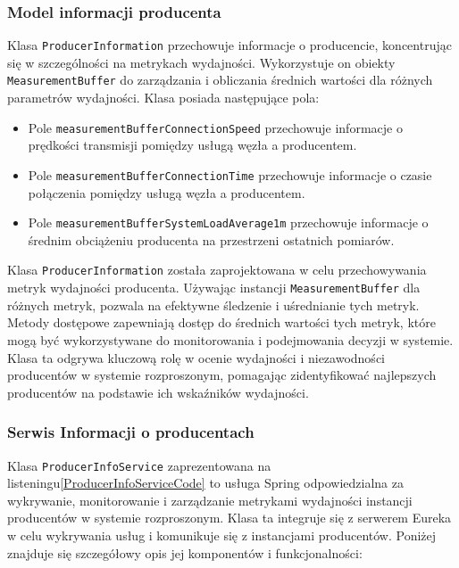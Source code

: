 \subsubsection{Model informacji producenta}

Klasa \verb|ProducerInformation| przechowuje informacje o producencie, koncentrując się w szczególności na metrykach wydajności. Wykorzystuje on obiekty \verb|MeasurementBuffer| do zarządzania i obliczania średnich wartości dla różnych parametrów wydajności. Klasa posiada następujące pola:

\begin{itemize}
    \item Pole \verb|measurementBufferConnectionSpeed| przechowuje informacje o prędkości transmisji pomiędzy usługą węzła a producentem.
    \item Pole \verb|measurementBufferConnectionTime| przechowuje informacje o czasie połączenia pomiędzy usługą węzła a producentem.
    \item Pole \verb|measurementBufferSystemLoadAverage1m| przechowuje informacje o średnim obciążeniu producenta na przestrzeni ostatnich pomiarów.
\end{itemize}

Klasa \verb|ProducerInformation| została zaprojektowana w celu przechowywania metryk wydajności producenta. Używając instancji \verb|MeasurementBuffer| dla różnych metryk, pozwala na efektywne śledzenie i uśrednianie tych metryk. Metody dostępowe zapewniają dostęp do średnich wartości tych metryk, które mogą być wykorzystywane do monitorowania i podejmowania decyzji w systemie. Klasa ta odgrywa kluczową rolę w ocenie wydajności i niezawodności producentów w systemie rozproszonym, pomagając zidentyfikować najlepszych producentów na podstawie ich wskaźników wydajności.

\subsubsection{Serwis Informacji o producentach}

Klasa \verb|ProducerInfoService| zaprezentowana na listeningu\ref{ProducerInfoServiceCode} to usługa Spring odpowiedzialna za wykrywanie, monitorowanie i zarządzanie metrykami wydajności instancji producentów w systemie rozproszonym. Klasa ta integruje się z serwerem Eureka w celu wykrywania usług i komunikuje się z instancjami producentów. Poniżej znajduje się szczegółowy opis jej komponentów i funkcjonalności:

